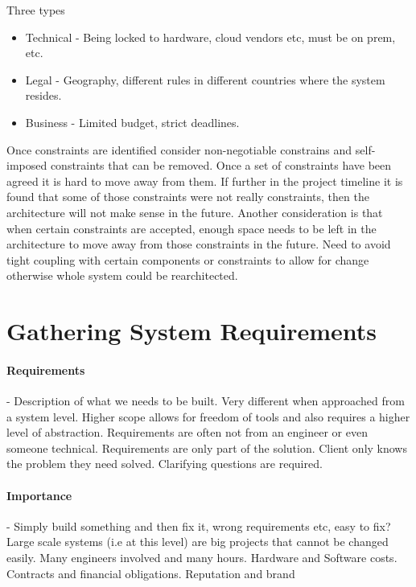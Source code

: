 \documentclass[a4paper, 11pt]{book}
\begin{document}
    Three types

    \begin{itemize}
        \item Technical - Being locked to hardware, cloud vendors etc, must be on prem, etc.
        \item Legal - Geography, different rules in different countries where the system resides.
        \item Business - Limited budget, strict deadlines.
    \end{itemize}

    Once constraints are identified consider non-negotiable constrains and self-imposed constraints that can be removed.
    Once a set of constraints have been agreed it is hard to move away from them.
    If further in the project timeline it is found that some of those constraints were not really constraints, then the architecture will not make sense in the future.
    Another consideration is that when certain constraints are accepted, enough space needs to be left in the architecture to move away from those constraints in the future.
    Need to avoid tight coupling with certain components or constraints to allow for change otherwise whole system could be rearchitected.

    \section{Gathering System Requirements}

    \paragraph{Requirements} - Description of what we needs to be built.
    Very different when approached from a system level.
    Higher scope allows for freedom of tools and also requires a higher level of abstraction.
    Requirements are often not from an engineer or even someone technical.
    Requirements are only part of the solution.
    Client only knows the problem they need solved.
    Clarifying questions are required.

    \paragraph{Importance} - Simply build something and then fix it, wrong requirements etc, easy to fix?
    Large scale systems (i.e at this level) are big projects that cannot be changed easily.
    Many engineers involved and many hours.
    Hardware and Software costs.
    Contracts and financial obligations.
    Reputation and brand
\end{document}
